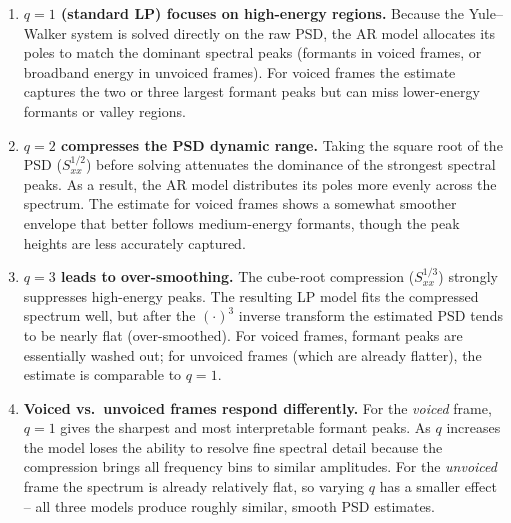 \documentclass[12pt,a4paper,onecolumn]{exam}
\begin{document}
\begin{enumerate}
  \item \textbf{$q=1$ (standard LP) focuses on high-energy regions.}
        Because the Yule--Walker system is solved directly on the raw PSD,
        the AR model allocates its poles to match the dominant spectral
        peaks (formants in voiced frames, or broadband energy in unvoiced frames).
        For voiced frames the estimate captures the two or three largest
        formant peaks but can miss lower-energy formants or valley regions.

  \item \textbf{$q=2$ compresses the PSD dynamic range.}
        Taking the square root of the PSD ($S_{xx}^{1/2}$) before solving
        attenuates the dominance of the strongest spectral peaks.
        As a result, the AR model distributes its poles more evenly across
        the spectrum. The estimate for voiced frames shows a somewhat
        smoother envelope that better follows medium-energy formants,
        though the peak heights are less accurately captured.

  \item \textbf{$q=3$ leads to over-smoothing.}
        The cube-root compression ($S_{xx}^{1/3}$) strongly suppresses
        high-energy peaks. The resulting LP model fits the compressed
        spectrum well, but after the $(\cdot)^3$ inverse transform the
        estimated PSD tends to be nearly flat (over-smoothed).
        For voiced frames, formant peaks are essentially washed out;
        for unvoiced frames (which are already flatter), the estimate
        is comparable to $q=1$.

  \item \textbf{Voiced vs.\ unvoiced frames respond differently.}
        For the \emph{voiced} frame, $q=1$ gives the sharpest and most
        interpretable formant peaks. As $q$ increases the model loses
        the ability to resolve fine spectral detail because the
        compression brings all frequency bins to similar amplitudes.
        For the \emph{unvoiced} frame the spectrum is already
        relatively flat, so varying $q$ has a smaller effect --
        all three models produce roughly similar, smooth PSD estimates.
\end{enumerate}
\end{document}
